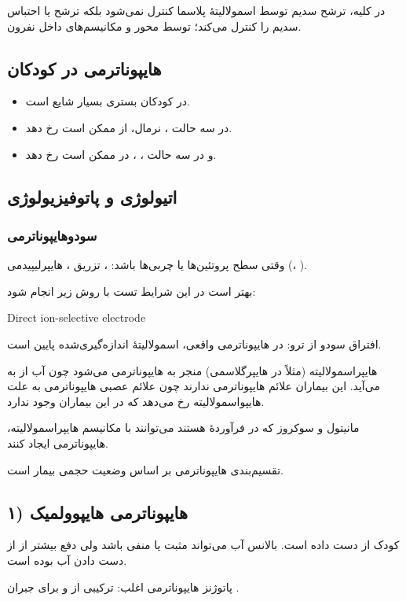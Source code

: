 \documentclass[12pt,a4paper]{article}
\begin{document}
در کلیه، ترشح سدیم توسط اسمولالیتهٔ پلاسما کنترل نمی‌شود بلکه  ترشح یا احتباس سدیم را کنترل می‌کند؛ توسط محور  و مکانیسم‌های داخل نفرون.

\subsection*{هایپوناترمی در کودکان}
\begin{itemize}
\item در کودکان بستری بسیار شایع است.
\item در سه حالت ، نرمال،  از  ممکن است رخ دهد.
\item و در سه حالت ، ،  در  ممکن است رخ دهد.
\end{itemize}
\subsection*{اتیولوژی و پاتوفیزیولوژی}
\subsubsection*{سودوهایپوناترمی}
وقتی سطح پروتئین‌ها یا چربی‌ها  باشد: ، تزریق ، هایپرلیپیدمی (، ).

بهتر است در این شرایط تست با روش زیر انجام شود:
\begin{latin}
Direct ion-selective electrode
\end{latin}

افتراق سودو از ترو: در هایپوناترمی واقعی، اسمولالیتهٔ اندازه‌گیری‌شده پایین است.

هایپراسمولالیته (مثلاً در هایپرگلاسمی) منجر به هایپوناترمی می‌شود چون آب از  به  می‌آید.
این بیماران علائم هایپوناترمی ندارند چون علائم عصبی هایپوناترمی به علت هایپواسمولالیته رخ می‌دهد که در این بیماران وجود ندارد.

مانیتول و سوکروز که در فرآوردهٔ  هستند می‌توانند با مکانیسم هایپراسمولالیته، هایپوناترمی ایجاد کنند.

تقسیم‌بندی هایپوناترمی بر اساس وضعیت حجمی بیمار است.
\subsection*{۱) هایپوناترمی هایپوولمیک}
کودک  از دست داده است. بالانس آب می‌تواند مثبت یا منفی باشد ولی دفع  بیشتر از از دست دادن آب بوده است.

پاتوژنز هایپوناترمی اغلب: ترکیبی از  و  برای جبران .
\end{document}
